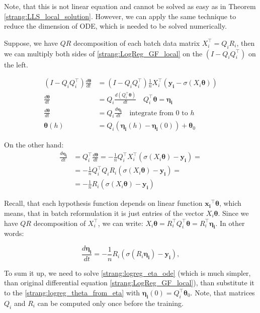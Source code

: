 \documentclass{article}
\newcommand{\vect}[1]{\boldsymbol{\mathbf{#1}}}
\begin{document}
Note, that this is not linear equation and cannot be solved as easy as in Theorem \ref{strang:LLS_local_solution}. However, we can apply the same technique to reduce the dimension of ODE, which is needed to be solved numerically. 

Suppose, we have $QR$ decomposition of each batch data matrix $X_i^\top = Q_i R_i$, then we can multiply both sides of \eqref{strang:LogReg_GF_local} on the $(I - Q_iQ_i^\top)$ on the left. 

\begin{align}
\nonumber (I - Q_iQ_i^\top)\frac{d \vect{\theta}}{d t} &= (I - Q_iQ_i^\top) \frac{1}{n} X_i^\top(\vect{y_i} -\sigma\left(X_i\vect{\theta}\right)) \\
\nonumber \frac{d \vect{\theta}}{d t} &= Q_i\frac{d (Q_i^\top\vect{\theta})}{d t} \quad Q_i^\top \vect{\theta} = \vect{\eta_i}\\ 
\nonumber \frac{d \vect{\theta}}{d t} &= Q_i\frac{d \vect{\eta_i}}{d t} \quad \text{integrate from $0$ to $h$}\\ 
\label{strang:logreg_theta_from_eta}\vect{\theta}(h) &= Q_i \left(\vect{\eta_i}(h) - \vect{\eta_i}(0) \right) + \vect{\theta}_0
\end{align}

On the other hand:
\begin{align}\nonumber
\frac{d \vect{\eta_i}}{d t} &= Q_i^\top\frac{d \vect{\theta}}{d t} =  - \frac{1}{n} Q_i^\top  X_i^\top(\sigma\left(X_i\vect{\theta}\right) - \vect{y_i}) = \\ 
\nonumber&= - \frac{1}{n} Q_i^\top  Q_i R_i(\sigma\left(X_i\vect{\theta}\right) - \vect{y_i}) =\\
\nonumber&= - \frac{1}{n} R_i(\sigma\left(X_i\vect{\theta}\right) - \vect{y_i})
\end{align}

Recall, that each hypothesis function depends on linear function $\vect{x_i}^\top \vect{\theta}$, which means, that in batch reformulation it is just entries of the vector $X_i \vect{\theta}$. Since we have $QR$ decomposition of $X_i^\top$, we can write: $X_i \vect{\theta} = R_i^\top Q_i^\top \vect{\theta} = R_i^\top \vect{\eta_i}$. In other words:

\begin{equation}
\label{strang:logreg_eta_ode}
\frac{d \vect{\eta_i}}{d t} = - \frac{1}{n} R_i\left(\sigma\left(R_i \vect{\eta_i}\right) - \vect{y_i}\right),
\end{equation}

To sum it up, we need to solve \eqref{strang:logreg_eta_ode} (which is much simpler, than original differential equation \eqref{strang:LogReg_GF_local}), than substitute it to the
\eqref{strang:logreg_theta_from_eta} with $\vect{\eta_i}(0) = Q_i^\top \vect{\theta}_0$. Note, that matrices $Q_i$ and $R_i$ can be computed only once before the training.
\end{document}
